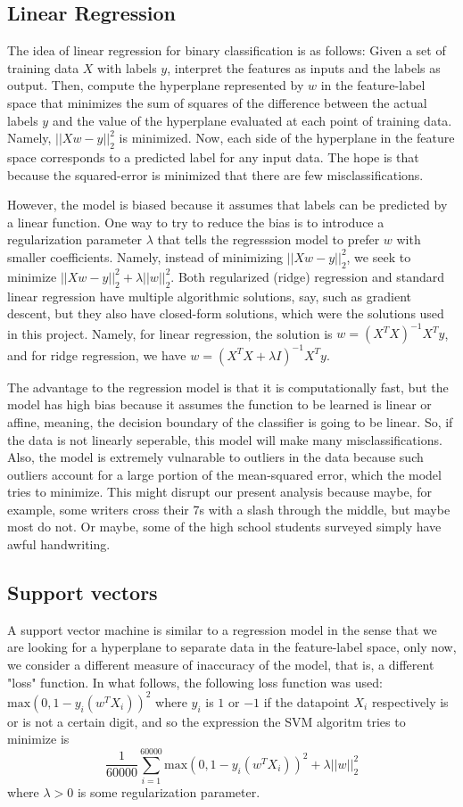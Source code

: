 \documentclass{article}
\begin{document}
\subsection{Linear Regression}

The idea of linear regression for binary classification is as follows: Given a set of training data $X$ with labels $y$, interpret the features as inputs and the labels as output. Then, compute the hyperplane represented by $w$ in the feature-label space that minimizes the sum of squares of the difference between the actual labels $y$ and the value of the hyperplane evaluated at each point of training data. Namely, $||Xw - y||^2_2$ is minimized. Now, each side of the hyperplane in the feature space corresponds to a predicted label for any input data. The hope is that because the squared-error is minimized that there are few misclassifications. 

However, the model is biased because it assumes that labels can be predicted by a linear function. One way to try to reduce the bias is to introduce a regularization parameter $\lambda$ that tells the regresssion model to prefer $w$ with smaller coefficients. Namely, instead of minimizing $||Xw - y||^2_2$, we seek to minimize $||Xw - y||^2_2 + \lambda ||w||_2^2$. Both regularized (ridge) regression and standard linear regression have multiple algorithmic solutions, say, such as gradient descent, but they also have closed-form solutions, which were the solutions used in this project. Namely, for linear regression, the solution is $w = (X^TX)^{-1} X^T y$, and for ridge regression, we have $w = (X^TX + \lambda I)^{-1} X^T y$.

The advantage to the regression model is that it is computationally fast, but the model has high bias because it assumes the function to be learned is linear or affine, meaning, the decision boundary of the classifier is going to be linear. So, if the data is not linearly seperable, this model will make many misclassifications. Also, the model is extremely vulnarable to outliers in the data because such outliers account for a large portion of the mean-squared error, which the model tries to minimize. This might disrupt our present analysis because maybe, for example, some writers cross their 7s with a slash through the middle, but maybe most do not. Or maybe, some of the high school students surveyed simply have awful handwriting. 

\subsection{Support vectors} A support vector machine is similar to a regression model in the sense that we are looking for a hyperplane to separate data in the feature-label space, only now, we consider a different measure of inaccuracy of the model, that is, a different "loss" function. In what follows, the following loss function was used: $\mbox{max}(0,1-y_i (w^T X_i))^2$ where $y_i$ is $1$ or $-1$ if the datapoint $X_i$ respectively is or is not a certain digit, and so the expression the SVM algoritm tries to minimize is $$\frac{1}{60000} \sum_{i = 1}^{60000} \mbox{max}(0,1-y_i (w^T X_i))^2  + \lambda ||w||_2^2$$ where $\lambda > 0$ is some regularization parameter. 
\end{document}
